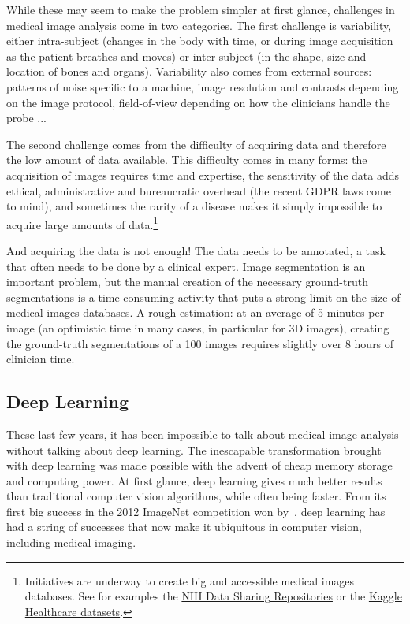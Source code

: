 While these may seem to make the problem simpler at first glance, challenges in medical image analysis come in two categories. The first challenge is variability, either intra-subject (changes in the body with time, or during image acquisition as the patient breathes and moves) or inter-subject (in the shape, size and location of bones and organs). Variability also comes from external sources: patterns of noise specific to a machine, image resolution and contrasts depending on the image protocol, field-of-view depending on how the clinicians handle the probe ... 

The second challenge comes from the difficulty of acquiring data and therefore the low amount of data available. This difficulty comes in many forms: the acquisition of images requires time and expertise, the sensitivity of the data adds ethical, administrative and bureaucratic overhead (the recent GDPR laws come to mind), and sometimes the rarity of a disease makes it simply impossible to acquire large amounts of data.\footnote{Initiatives are underway to create big and accessible medical images databases. See for examples the \href{https://www.nlm.nih.gov/NIHbmic/nih_data_sharing_repositories.html}{NIH Data Sharing Repositories} or the \href{https://www.kaggle.com/datasets?tagids=4202}{Kaggle Healthcare datasets}.} 

And acquiring the data is not enough! The data needs to be annotated, a task that often needs to be done by a clinical expert. Image segmentation is an important problem, but the manual creation of the necessary ground-truth segmentations is a time consuming activity that puts a strong limit on the size of medical images databases. A rough estimation: at an average of 5 minutes per image (an optimistic time in many cases, in particular for 3D images), creating the ground-truth segmentations of a 100 images requires slightly over 8 hours of clinician time.

\subsection{Deep Learning}

These last few years, it has been impossible to talk about medical image analysis without talking about deep learning. The inescapable transformation brought with deep learning was made possible with the advent of cheap memory storage and computing power. At first glance, deep learning gives much better results than traditional computer vision algorithms, while often being faster. From its first big success in the 2012 ImageNet competition won by~\textcite{krizhevsky2012NIPS}, deep learning has had a string of successes that now make it ubiquitous in computer vision, including medical imaging.

